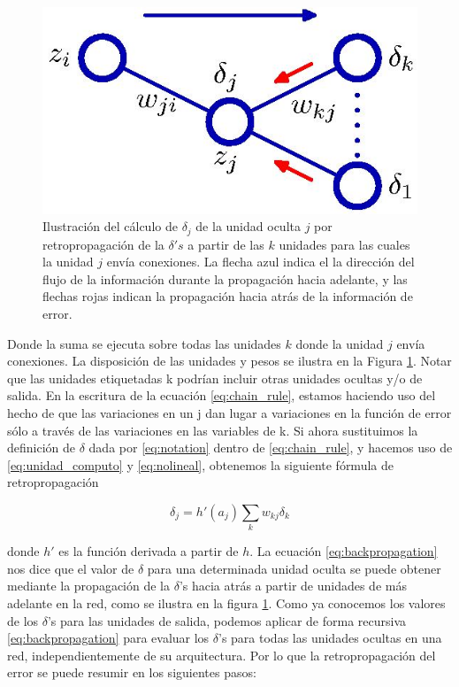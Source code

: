 \documentclass[a4paper,11pt,spanish]{book}
\begin{document}
	\begin{figure}[ht]
	  \begin{center}
	  \includegraphics[width=0.5\linewidth]{./img/bishop_backpropagation.jpg}
	  \end{center}
	  \caption{Ilustración del cálculo de $\delta_j$ de la unidad oculta  $j$ por retropropagación de la $\delta 's$ a partir de las $k$ unidades para las cuales la unidad $j$ envía
	    conexiones. La flecha azul indica el la dirección del flujo de la información durante la propagación hacia adelante, y las flechas rojas indican la propagación
	    hacia atrás de la información de error.}
	  \label{fig:backpropagation}
	\end{figure}
	
	Donde la suma se ejecuta sobre todas las unidades $k$ donde la unidad $j$ envía conexiones. 
	La disposición de las unidades y pesos se ilustra en la Figura \ref{fig:backpropagation}.
	Notar que las unidades etiquetadas k podrían incluir otras unidades ocultas y/o de salida.
	En la escritura de la ecuación \eqref{eq:chain_rule}, estamos haciendo uso del hecho de que las variaciones en un j dan lugar a variaciones en la función de error 
	sólo a través de las variaciones en las variables de k. 
	Si ahora sustituimos la definición de $\delta$ dada por \eqref{eq:notation} dentro de \eqref{eq:chain_rule}, y hacemos uso de \eqref{eq:unidad_computo} y 
	\eqref{eq:nolineal}, obtenemos la siguiente fórmula de retropropagación
	
	\begin{equation}\label{eq:backpropagation}
	  \delta_j = h'(a_j) \sum_k w_{kj} \delta_k
	\end{equation}
	
	donde $h'$ es la función derivada a partir de $h$. 
	La ecuación \eqref{eq:backpropagation} nos dice que el valor de $\delta$ para una determinada unidad oculta se puede obtener mediante la propagación de 
	la $\delta$'s hacia atrás a partir de unidades de más adelante en la red, como se ilustra en la figura \ref{fig:backpropagation}.
	Como ya conocemos los valores de los $\delta$'s para las unidades de salida, podemos aplicar de forma recursiva \eqref{eq:backpropagation} para evaluar 
	los $\delta$'s para todas las unidades ocultas en una red, independientemente de su arquitectura.
	Por lo que la retropropagación del error se puede resumir en los siguientes pasos:
	
\end{document}
